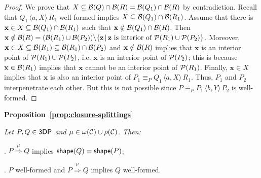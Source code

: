 \documentclass[11pt]{article}
\newcommand{\vect}[1]{\mathbf{#1}}
\newcommand{\proc}{\sf{3DP}}
\newcommand{\channels}{{\cal C}}
\newcommand{\unionc}[1]{\,\langle #1 \rangle\,}
\newcommand{\dnar}[1]{\stackrel{#1}{\Rightarrow}}
\newcommand{\shape}{{\sf shape}}
\newcommand{\boundary}[1]{\ensuremath{{\cal B}(#1)}}
\newcommand{\points}[1]{\ensuremath{{\cal P}(#1)}}
\begin{document}
\begin{proof}
\par\smallskip\noindent
We prove that $X \subseteq \boundary{Q} \cap \boundary{R} = \boundary{Q_1} \cap \boundary{R}$ by
contradiction. Recall that $Q_1 \unionc{a,X} R_1$  well-formed implies $X \subseteq \boundary{Q_1}
\cap \boundary{R_1}$. Assume that there is $\vect{x} \in X \subseteq \boundary{Q_1} \cap
\boundary{R_1}$ such that $\vect{x} \notin \boundary{Q_1} \cap \boundary{R}$. Then $\vect{x} \notin
\boundary{R} = (\boundary{R_1} \cup \boundary{P_2}) \backslash \{\vect{z} \,|\, \vect{z} \mbox{ is
interior of } \points{R_1} \cup \points{P_2}\}$. Moreover, $\vect{x} \in X \subseteq \boundary{R_1}
\subseteq \boundary{R_1} \cap \boundary{P_2}$ and $\vect{x} \notin \boundary{R}$ implies that
$\vect{x}$ is an interior point of $\points{R_1} \cup  \points{P_2}$, i.e. $\vect{x}$ is an interior
point of $\points{P_2}$; this is  because $\vect{x} \in \boundary{R_1}$ implies that $\vect{x}$
cannot be an interior point of $\points{R_1}$. Finally, $\vect{x} \in X$ implies that $\vect{x}$ is
also an interior  point of $P_1 \equiv_P Q_1 \unionc{a, X} R_1$. Thus, $P_1$ and $P_2$
interpenetrate each other. But this is not possible since $P \equiv_P P_1 \unionc{b, Y} P_2$ is 
well-formed.
\end{proof}

\par\bigskip\noindent
{\bf Proposition~\ref{prop:closure-splittings}}{\it
Let $P, Q\in \proc$  and $\mu \in \omega(\channels) \cup \rho(\channels)$. Then:

\par\medskip{}. $P \dnar{\mu} Q$ implies $\shape(Q) = \shape(P)$;

\par\smallskip{}.  $P$ well-formed and $P\dnar{\mu} Q$ implies $Q$ well-formed.}
\end{document}

